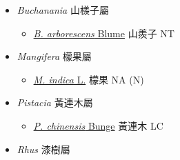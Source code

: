 
  \begin{itemize}
 \item[] \textit{Buchanania} 山檨子屬
                                
  \begin{itemize}
        \item[] \href{http://www.theplantlist.org/tpl1.1/search?q=Buchanania+arborescens}{\textit{B. arborescens} Blume}   山羨子   NT
  \end{itemize}
 \item[] \textit{Mangifera} 檬果屬
                                
  \begin{itemize}
        \item[] \href{http://www.theplantlist.org/tpl1.1/search?q=Mangifera+indica}{\textit{M. indica} L.}   檬果   NA (N)
  \end{itemize}
 \item[] \textit{Pistacia} 黃連木屬
                                
  \begin{itemize}
        \item[] \href{http://www.theplantlist.org/tpl1.1/search?q=Pistacia+chinensis}{\textit{P. chinensis} Bunge}   黃連木   LC
  \end{itemize}
 \item[] \textit{Rhus} 漆樹屬
                                

\end{itemize}
